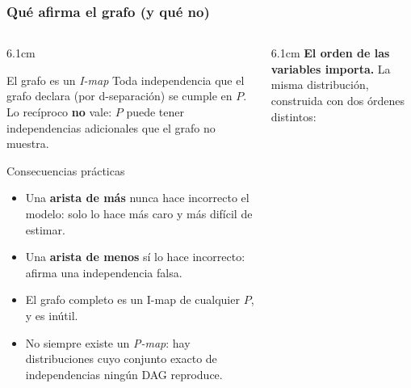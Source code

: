 \documentclass[aspectratio=169, 10pt]{beamer}
\begin{document}
\begin{frame}
\frametitle{Qué afirma el grafo (y qué no)}
\begin{columns}[T]
\begin{column}{6.1cm}
\begin{block}{El grafo es un \emph{I-map}}
\footnotesize
Toda independencia que el grafo declara (por d-separación) se cumple en $P$. Lo recíproco \textbf{no} vale: $P$ puede tener independencias adicionales que el grafo no muestra.
\end{block}
\vspace{-0.2em}
\begin{alertblock}{Consecuencias prácticas}
\footnotesize
\begin{itemize}
	\item Una \textbf{arista de más} nunca hace incorrecto el modelo: solo lo hace más caro y más difícil de estimar.
	\item Una \textbf{arista de menos} sí lo hace incorrecto: afirma una independencia falsa.
	\item El grafo completo es un I-map de cualquier $P$, y es inútil.
	\item No siempre existe un \emph{P-map}: hay distribuciones cuyo conjunto exacto de independencias ningún DAG reproduce.
\end{itemize}
\end{alertblock}
\end{column}
\begin{column}{6.1cm}
\textbf{El orden de las variables importa.} La misma distribución, construida con dos órdenes distintos:
\vspace{0.3em}
\begin{center}
\end{center}
\end{column}
\end{columns}
\end{frame}
\end{document}
